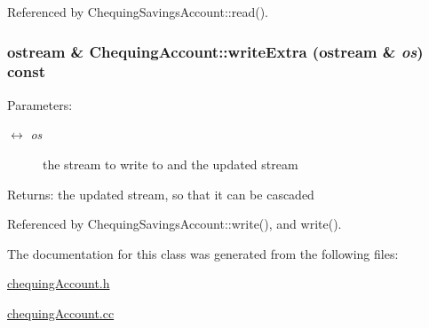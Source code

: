 Referenced by ChequingSavingsAccount::read().\hypertarget{classChequingAccount_5f2831100ca8357b9d74a1402477f3f6}{
\subsubsection[writeExtra]{\setlength{\rightskip}{0pt plus 5cm}ostream \& ChequingAccount::writeExtra (ostream \& {\em os}) const}}
\label{classChequingAccount_5f2831100ca8357b9d74a1402477f3f6}


\begin{Desc}
\item[Parameters:]
\begin{description}
\item[\mbox{$\leftrightarrow$} {\em os}]the stream to write to and the updated stream \end{description}
\end{Desc}
\begin{Desc}
\item[Returns:]the updated stream, so that it can be cascaded \end{Desc}


Referenced by ChequingSavingsAccount::write(), and write().

The documentation for this class was generated from the following files:\begin{CompactItemize}
\item 
\hyperlink{chequingAccount_8h}{chequingAccount.h}\item 
\hyperlink{chequingAccount_8cc}{chequingAccount.cc}\end{CompactItemize}
